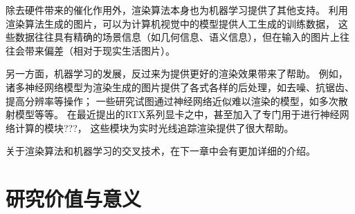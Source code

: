 除去硬件带来的催化作用外，渲染算法本身也为机器学习提供了其他支持。
利用渲染算法生成的图片，可以为计算机视觉中的模型提供人工生成的训练数据，
这些数据往往具有精确的场景信息（如几何信息、语义信息），但在输入的图片上往往会带来偏差（相对于现实生活图片）。

另一方面，机器学习的发展，反过来为提供更好的渲染效果带来了帮助。
例如，诸多神经网络模型为渲染生成的图片提供了各式各样的后处理，如去噪、抗锯齿、提高分辨率等操作；
一些研究试图通过神经网络近似难以渲染的模型，如多次散射模型等等。
在最近提出的RTX系列显卡之中，甚至加入了专门用于进行神经网络计算的模块???，
这些模块为实时光线追踪渲染提供了很大帮助。

关于渲染算法和机器学习的交叉技术，在下一章中会有更加详细的介绍。

\section{研究价值与意义}

